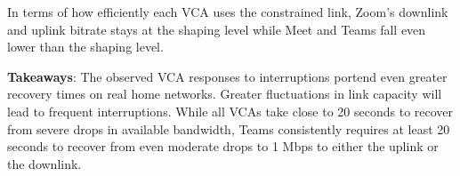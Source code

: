 In terms of how efficiently each VCA uses the constrained link, Zoom's downlink and uplink bitrate stays at the shaping level while Meet and Teams fall even lower than the shaping level. 

\noindent \textbf{Takeaways}: The observed VCA responses to interruptions portend even greater recovery times on real home networks. Greater fluctuations in link capacity will lead to frequent interruptions. While all VCAs take close to 20 seconds to recover from severe drops in available bandwidth, Teams consistently requires at least 20 seconds to recover from even moderate drops to 1 Mbps to either the uplink or the downlink.






